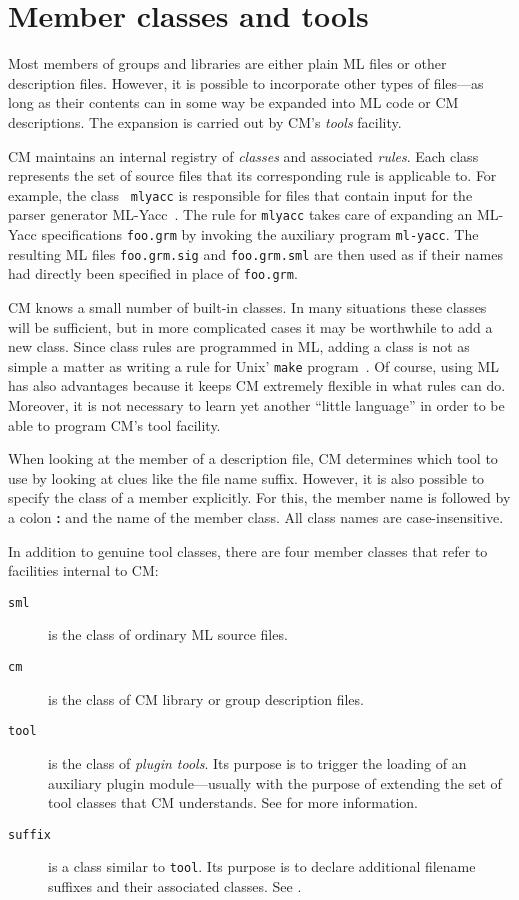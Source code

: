 %

\chapter{Member classes and tools}
\label{chap:classes}

Most members of groups and libraries are either plain ML files or
other description files.  However, it is possible to incorporate other
types of files---as long as their contents can in some way be expanded
into ML code or CM descriptions.  The expansion is carried out by CM's
{\it tools} facility.

CM maintains an internal registry of {\em classes} and associated {\em
rules}.  Each class represents the set of source files that its
corresponding rule is applicable to.  For example, the class {\tt
mlyacc} is responsible for files that contain input for the parser
generator ML-Yacc~\cite{tarditi90:yacc}.  The rule for {\tt mlyacc}
takes care of expanding an ML-Yacc specifications {\tt foo.grm} by
invoking the auxiliary program {\tt ml-yacc}.  The resulting ML files
{\tt foo.grm.sig} and {\tt foo.grm.sml} are then used as if their
names had directly been specified in place of {\tt foo.grm}.

CM knows a small number of built-in classes.  In many situations these
classes will be sufficient, but in more complicated cases it may be
worthwhile to add a new class.  Since class rules are programmed in
ML, adding a class is not as simple a matter as writing a rule for
{\sc Unix}' {\tt make} program~\cite{feldman79}.  Of course,
using ML has also advantages because it keeps CM extremely flexible in
what rules can do.  Moreover, it is not necessary to learn yet another
``little language'' in order to be able to program CM's tool facility.

When looking at the member of a description file, CM determines which
tool to use by looking at clues like the file name suffix.  However,
it is also possible to specify the class of a member explicitly.  For
this, the member name is followed by a colon {\bf :} and the name of
the member class.  All class names are case-insensitive.

In addition to genuine tool classes, there are four member classes
that refer to facilities internal to CM:
\begin{description}
\item[{\tt sml}] is the class of ordinary ML source files.
\item[{\tt cm}] is the class of CM library or group description files.
\item[{\tt tool}] is the class of {\em plugin tools}.  Its purpose is
to trigger the loading of an auxiliary plugin module---usually with the
purpose of extending the set of tool classes that CM understands.
See  for more information.
\item[{\tt suffix}] is a class similar to {\tt tool}.  Its purpose is
to declare additional filename suffixes and their associated classes.
See .
\end{description}

